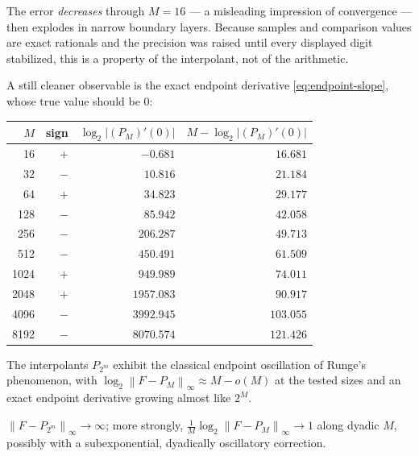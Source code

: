 \documentclass[11pt,oneside]{article}
\numberwithin{equation}{section}
\theoremstyle{definition}
\theoremstyle{remark}
\newcommand{\abs}[1]{\left\lvert #1\right\rvert}
\newcommand{\norm}[1]{\left\lVert #1\right\rVert}
\begin{document}
The error \emph{decreases} through $M=16$ --- a misleading impression
of convergence --- then explodes in narrow boundary layers.  Because
samples and comparison values are exact rationals and the precision
was raised until every displayed digit stabilized, this is a property
of the interpolant, not of the arithmetic.

A still cleaner observable is the exact endpoint derivative
\eqref{eq:endpoint-slope}, whose true value should be $0$:

\begin{center}
\small
\begin{tabular}{rrrr}
\toprule
$M$ & sign & $\log_2\abs{(P_M)'(0)}$ & $M-\log_2\abs{(P_M)'(0)}$ \\
\midrule
16   & $+$ & $-0.681$   & $16.681$ \\
32   & $-$ & $10.816$   & $21.184$ \\
64   & $+$ & $34.823$   & $29.177$ \\
128  & $-$ & $85.942$   & $42.058$ \\
256  & $-$ & $206.287$  & $49.713$ \\
512  & $-$ & $450.491$  & $61.509$ \\
1024 & $+$ & $949.989$  & $74.011$ \\
2048 & $+$ & $1957.083$ & $90.917$ \\
4096 & $-$ & $3992.945$ & $103.055$ \\
8192 & $-$ & $8070.574$ & $121.426$ \\
\bottomrule
\end{tabular}
\label{tab:derivative-defect}
\end{center}

\begin{observation}
The interpolants $P_{2^{m}}$ exhibit the classical endpoint
oscillation of Runge's phenomenon, with
$\log_2\norm{F-P_M}_\infty\approx M-o(M)$ at the tested sizes and an
exact endpoint derivative growing almost like $2^{M}$.
\end{observation}

\begin{conjecture}
\label{conj:runge-divergence}
$\norm{F-P_{2^{m}}}_\infty\to\infty$; more strongly,
$\tfrac1M\log_2\norm{F-P_M}_\infty\to1$ along dyadic $M$, possibly
with a subexponential, dyadically oscillatory correction.
\end{conjecture}
\end{document}
